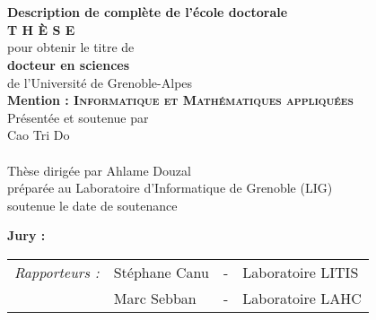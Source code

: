 \cleardoublepage
\begin{titlepage}
\begin{center}
 \\
\vspace*{0.3cm}
 \\
\noindent \textbf{Description de complète de l'école doctorale} \\
\vspace*{0.5cm}
\noindent \Huge \textbf{T H È S E} \\
\vspace*{0.3cm}
\noindent \large {pour obtenir le titre de} \\
\vspace*{0.3cm}
\noindent \LARGE \textbf{docteur en sciences} \\
\vspace*{0.3cm}
\noindent \Large de l'Université de Grenoble-Alpes\\
\noindent \Large \textbf{Mention : \textsc{Informatique et Mathématiques appliquées}}\\
\vspace*{0.4cm}
\noindent \large {Présentée et soutenue par\\}
\noindent \LARGE Cao Tri Do \\
\vspace*{0.8cm}
 \\
\vspace*{0.8cm}
\noindent \Large Thèse dirigée par Ahlame Douzal\\
\vspace*{0.2cm}
\noindent \Large préparée au Laboratoire d'Informatique de Grenoble (LIG) \\
\vspace*{0.2cm}
\noindent \large soutenue le date de soutenance \\
\vspace*{0.5cm}
\end{center}
\noindent \large \textbf{Jury :} \\
\begin{center}
\noindent \large 
\begin{tabular}{llcl}
      \textit{Rapporteurs :}	& Stéphane Canu		& - & Laboratoire LITIS\\
                				& Marc Sebban		& - & Laboratoire LAHC\\

\end{tabular}
\end{center}
\end{titlepage}
